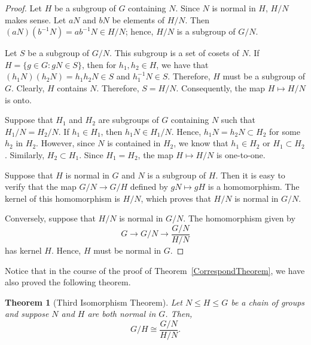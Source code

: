 \documentclass[12pt]{article}
\theoremstyle{plain}
\newtheorem{theorem} {Theorem}
\theoremstyle{definition}
\theoremstyle{remark}
\theoremstyle{remark}
\numberwithin{theorem}{section}
\numberwithin{equation}{section}
\newcommand{\<}{\ensuremath{\langle}}
\renewcommand{\>}{\ensuremath{\rangle}}
\renewcommand{\leq}{\ensuremath{\leqslant}}
\begin{document}
 
\begin{proof}
Let $H$ be a subgroup of $G$ containing $N$. Since $N$ is normal in
$H$, $H/N$ makes sense.  Let $aN$ and $bN$ be elements of $H/N$. Then
$(aN)( b^{-1} N )= ab^{-1}N \in H/N$; hence, $H/N$ is a subgroup of
$G/N$. 


Let $S$ be a subgroup of $G/N$. This subgroup is a set of cosets of
$N$.  If  $H= \{ g \in G : gN \in S \}$, then for $h_1, h_2 \in H$, we
have that $(h_1 N)( h_2 N )= h_1 h_2 N \in S$ and $h_1^{-1} N \in S$.
Therefore, $H$ must be a subgroup of $G$. Clearly, $H$ contains $N$.
Therefore, $S = H / N$. Consequently, the map  $H \mapsto H/N$ is
onto. 

    
Suppose that $H_1$ and $H_2$ are subgroups of $G$ containing $N$ such
that $H_1/N = H_2/N$. If $h_1 \in H_1$, then $h_1 N \in H_1/N$. Hence,
$h_1 N = h_2 N \subset H_2$ for some $h_2$ in $H_2$. However, since
$N$ is contained in $H_2$, we know that $h_1 \in H_2$ or $H_1 \subset
H_2$. Similarly, $H_2 \subset H_1$.  Since $H_1 = H_2$, the map  $H
\mapsto H/N$ is one-to-one. 




 
Suppose that $H$ is normal in $G$ and $N$ is a subgroup of $H$.  Then
it is easy to verify that the map $G/N \rightarrow G/H$ defined by $gN
\mapsto gH$ is  a homomorphism.  The kernel of this homomorphism is
$H/N$, which proves that $H/N$ is normal in $G/N$. 
 
 
Conversely, suppose that $H/N$ is normal in $G/N$. The homomorphism
given by 
\[
G \rightarrow G/N \rightarrow \frac{G/N}{H/N}
\]
has kernel $H$. Hence, $H$ must be normal in $G$.
\end{proof}
 
\medskip
 
 
Notice that in the course of the proof of Theorem~\ref{CorrespondTheorem}, we have also
proved the following theorem. 
 



  \begin{theorem}[Third Isomorphism Theorem]
    Let $N \leq H \leq G$ be a chain of groups and suppose $N$ and $H$ are both
    normal in $G$. Then,
    \[
    G/H \cong \frac{G/N}{H/N}.
    \]
  \end{theorem}
 
\end{document}
